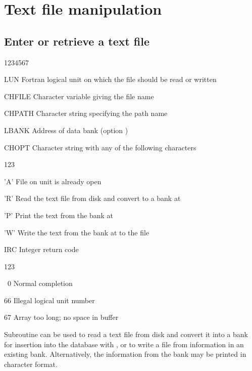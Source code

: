 \section{Text file manipulation}

\subsection{Enter or retrieve a text file}


\begin{DLtt}{1234567}
\item[LUN]Fortran logical unit on which the file should be read or written
\item[CHFILE]Character variable giving the file name
\item[CHPATH]Character string specifying the path name
\item[LBANK]Address of data bank (option )
\item[CHOPT]Character string with any of the following characters
  \begin{DLtt}{123}
    \item['A']File on unit  is already open
    \item['R']Read the text file from disk and convert to a bank at 
    \item['P']Print the text from the bank at 
    \item['W']Write the text from the bank at  to the file 
  \end{DLtt}
\item[IRC]Integer return code
  \begin{DLtt}{123}
    \item[\ 0]Normal completion
    \item[66]Illegal logical unit number
    \item[67]Array too long; no space in buffer
  \end{DLtt}
\end{DLtt}

Subroutine  can be used to read a text file from disk
and convert it into a bank for insertion into the database with
, or to write a file from information in an existing
bank. Alternatively, the information from the bank may be printed
in character format.

